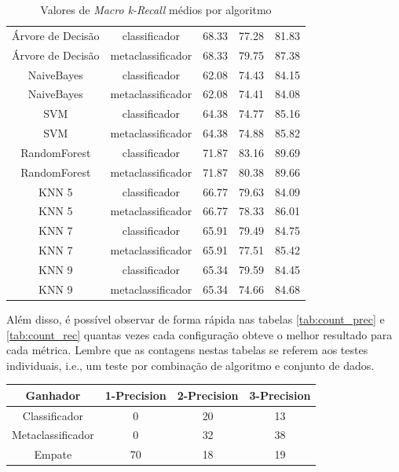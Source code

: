 {\begin{table}[h!]
\begin{center}
{\begin{tabular}{ccccc}
Árvore de Decisão	&	classificador	&	68.33	&	77.28	&	81.83	\\
Árvore de Decisão	&	metaclassificador	&	68.33	&	79.75	&	87.38	\\
NaiveBayes	&	classificador	&	62.08	&	74.43	&	84.15	\\
NaiveBayes	&	metaclassificador	&	62.08	&	74.41	&	84.08	\\
SVM	&	classificador	&	64.38	&	74.77	&	85.16	\\
SVM	&	metaclassificador	&	64.38	&	74.88	&	85.82	\\
RandomForest	&	classificador	&	71.87	&	83.16	&	89.69	\\
RandomForest	&	metaclassificador	&	71.87	&	80.38	&	89.66	\\
KNN 5	&	classificador	&	66.77	&	79.63	&	84.09	\\
KNN 5	&	metaclassificador	&	66.77	&	78.33	&	86.01	\\
KNN 7	&	classificador	&	65.91	&	79.49	&	84.75	\\
KNN 7	&	metaclassificador	&	65.91	&	77.51	&	85.42	\\
KNN 9	&	classificador	&	65.34	&	79.59	&	84.45	\\
KNN 9	&	metaclassificador	&	65.34	&	74.66	&	84.68	\\

      \hline
    \end{tabular}
    }
    \caption{Valores de \textit{Macro k-Recall} médios por algoritmo}
    \label{tab:rec}
  \end{center}
\end{table}

Além disso, é possível observar de forma rápida nas tabelas \ref{tab:count_prec} e \ref{tab:count_rec} quantas vezes cada configuração obteve o melhor resultado para cada métrica.
Lembre que as contagens nestas tabelas se referem aos testes individuais, i.e., um teste por combinação de algoritmo e conjunto de dados.

\begin{table}[h!]
  \begin{center}
    \begin{tabular}{cccc}
      \hline
      \textbf{Ganhador} & \textbf{1-Precision} & \textbf{2-Precision} & \textbf{3-Precision}\\
      \hline

Classificador	&	0	&	20	&	13	\\
Metaclassificador	&	0	&	32	&	38	\\
Empate	&	70	&	18	&	19	\\


\end{tabular}
\end{center}
\end{table}}
